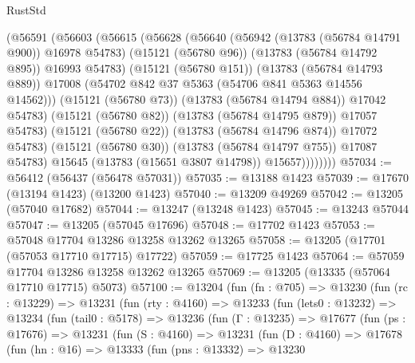\begin{lexlean}{RustStd}
\begin{coremodule}
                      (@56591
                        (@56603
                          (@56615
                            (@56628
                              (@56640
                                (@56942 (@13783 (@56784 @14791 @900)) @16978 @54783)
                                (@15121 (@56780 @96))
                                (@13783 (@56784 @14792 @895))
                                @16993
                                @54783)
                              (@15121 (@56780 @151))
                              (@13783 (@56784 @14793 @889))
                              @17008
                              (@54702 @842 @37 @5363 (@54706 @841 @5363 @14556 @14562)))
                            (@15121 (@56780 @73))
                            (@13783 (@56784 @14794 @884))
                            @17042
                            @54783)
                          (@15121 (@56780 @82))
                          (@13783 (@56784 @14795 @879))
                          @17057
                          @54783)
                        (@15121 (@56780 @22))
                        (@13783 (@56784 @14796 @874))
                        @17072
                        @54783)
                      (@15121 (@56780 @30))
                      (@13783 (@56784 @14797 @755))
                      @17087
                      @54783)
                    @15645
                    (@13783 (@15651 @3807 @14798))
                    @15657))))))))
@57034 := @56412 (@56437 (@56478 @57031))
@57035 := @13188 @1423
@57039 := @17670 (@13194 @1423) (@13200 @1423)
@57040 := @13209 @49269
@57042 := @13205 (@57040 @17682)
@57044 := @13247 (@13248 @1423)
@57045 := @13243 @57044
@57047 := @13205 (@57045 @17696)
@57048 := @17702 @1423
@57053 := @57048 @17704 @13286 @13258 @13262 @13265
@57058 := @13205 (@17701 (@57053 @17710 @17715) @17722)
@57059 := @17725 @1423
@57064 := @57059 @17704 @13286 @13258 @13262 @13265
@57069 := @13205 (@13335 (@57064 @17710 @17715) @5073)
@57100 := @13204
    (fun (fn : @705) =>
    @13230
      (fun (rc : @13229) =>
      @13231
        (fun (rty : @4160) =>
        @13233
          (fun (lets0 : @13232) =>
          @13234
            (fun (tail0 : @5178) =>
            @13236
              (fun (Γ : @13235) =>
              @17677
                (fun (ps : @17676) =>
                @13231
                  (fun (S : @4160) =>
                  @13231
                    (fun (D : @4160) =>
                    @17678
                      (fun (hn : @16) =>
                      @13333
                        (fun (pns : @13332) =>
                        @13230

\end{coremodule}
\end{lexlean}
